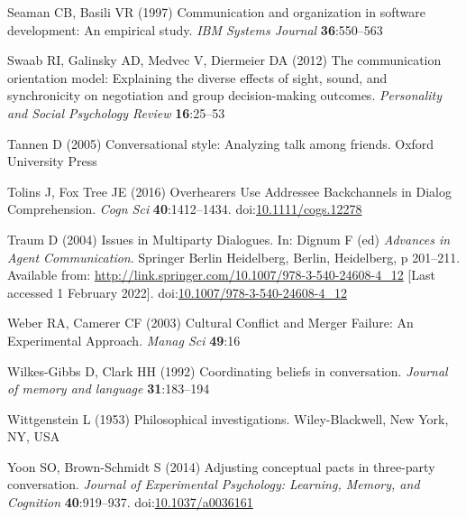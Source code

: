 \documentclass[
  english,
]{article}
\newlength{\cslhangindent}
\newlength{\cslentryspacingunit} %
\newenvironment{CSLReferences}[2] %
 {%
  \setlength{\parindent}{0pt}
  \ifodd #1
  \let\oldpar\par
  \def\par{\hangindent=\cslhangindent\oldpar}
  \fi
  \setlength{\parskip}{#2\cslentryspacingunit}
 }%
 {}
\begin{document}
\begin{CSLReferences}{1}{0}
\leavevmode{}%
Seaman CB, Basili VR (1997) Communication and organization in software development: An empirical study. \emph{IBM Systems Journal} \textbf{36}:550--563

\leavevmode{}%
Swaab RI, Galinsky AD, Medvec V, Diermeier DA (2012) The communication orientation model: Explaining the diverse effects of sight, sound, and synchronicity on negotiation and group decision-making outcomes. \emph{Personality and Social Psychology Review} \textbf{16}:25--53

\leavevmode{}%
Tannen D (2005) Conversational style: Analyzing talk among friends. Oxford University Press

\leavevmode{}%
Tolins J, Fox Tree JE (2016) Overhearers {Use Addressee Backchannels} in {Dialog Comprehension}. \emph{Cogn Sci} \textbf{40}:1412--1434. doi:\href{https://doi.org/10.1111/cogs.12278}{10.1111/cogs.12278}

\leavevmode{}%
Traum D (2004) Issues in {Multiparty Dialogues}. In: Dignum F (ed) \emph{Advances in {Agent Communication}}. {Springer Berlin Heidelberg}, {Berlin, Heidelberg}, p 201--211. Available from: \url{http://link.springer.com/10.1007/978-3-540-24608-4_12} {[}Last accessed 1 February 2022{]}. doi:\href{https://doi.org/10.1007/978-3-540-24608-4_12}{10.1007/978-3-540-24608-4\_12}

\leavevmode{}%
Weber RA, Camerer CF (2003) Cultural {Conﬂict} and {Merger Failure}: {An Experimental Approach}. \emph{Manag Sci} \textbf{49}:16

\leavevmode{}%
Wilkes-Gibbs D, Clark HH (1992) Coordinating beliefs in conversation. \emph{Journal of memory and language} \textbf{31}:183--194

\leavevmode{}%
Wittgenstein L (1953) Philosophical investigations. Wiley-Blackwell, New York, NY, USA

\leavevmode{}%
Yoon SO, Brown-Schmidt S (2014) Adjusting conceptual pacts in three-party conversation. \emph{Journal of Experimental Psychology: Learning, Memory, and Cognition} \textbf{40}:919--937. doi:\href{https://doi.org/10.1037/a0036161}{10.1037/a0036161}


\end{CSLReferences}
\end{document}
